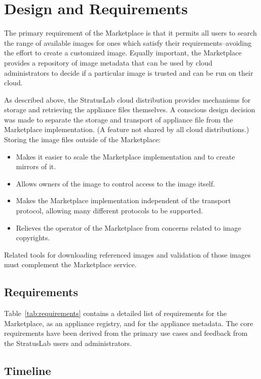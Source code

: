 \section{Design and Requirements}
\label{sec:design}

The primary requirement of the Marketplace is that it permits all
users to search the range of available images for ones which satisfy
their requirements--avoiding the effort to create a customized image.
Equally important, the Marketplace provides a repository of image
metadata that can be used by cloud administrators to decide if a
particular image is trusted and can be run on their cloud.

As described above, the StratusLab cloud distribution provides
mechanisms for storage and retrieving the appliance files themselves.
A conscious design decision was made to separate the storage and
transport of appliance file from the Marketplace implementation.  (A
feature not shared by all cloud distributions.)  Storing the image
files outside of the Marketplace:
\begin{itemize}
\item Makes it easier to scale the Marketplace implementation and to
  create mirrors of it.
\item Allows owners of the image to control access to the image
  itself.
\item Makes the Marketplace implementation independent of the
  transport protocol, allowing many different protocols to be
  supported.
\item Relieves the operator of the Marketplace from concerns related
  to image copyrights.
\end{itemize}
Related tools for downloading referenced images and validation of
those images must complement the Marketplace service.

\subsection{Requirements}

Table~\ref{tab:requirements} contains a detailed list of requirements
for the Marketplace, as an appliance registry, and for the appliance
metadata.  The core requirements have been derived from the primary
use cases and feedback from the StratusLab users and administrators.

\subsection{Timeline}

